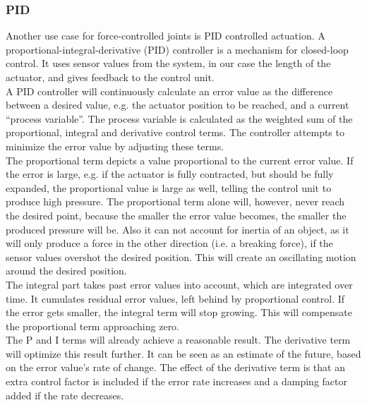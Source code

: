 \subsubsection{PID}\label{sec:pid}
Another use case for force-controlled joints is PID controlled actuation. A proportional-integral-derivative (PID) controller is a mechanism for closed-loop control. It uses sensor values from the system, in our case the length of the actuator, and gives feedback to the control unit.\\
A PID controller will continuously calculate an error value as the difference between a desired value, e.g. the actuator position to be reached, and a current ``process variable''. The process variable is calculated as the weighted sum of the proportional, integral and derivative control terms. The controller attempts to minimize the error value by adjusting these terms.\\
The proportional term depicts a value proportional to the current error value. If the error is large, e.g. if the actuator is fully contracted, but should be fully expanded, the proportional value is large as well, telling the control unit to produce high pressure. The proportional term alone will, however, never reach the desired point, because the smaller the error value becomes, the smaller the produced pressure will be. Also it can not account for inertia of an object, as it will only produce a force in the other direction (i.e. a breaking force), if the sensor values overshot the desired position. This will create an oscillating motion around the desired position.\\
The integral part takes past error values into account, which are integrated over time. It cumulates residual error values, left behind by proportional control. If the error gets smaller, the integral term will stop growing. This will compensate the proportional term approaching zero.\\
The P and I terms will already achieve a reasonable result. The derivative term will optimize this result further. It can be seen as an estimate of the future, based on the error value's rate of change. The effect of the derivative term is that an extra control factor is included if the error rate increases and a damping factor added if the rate decreases.

